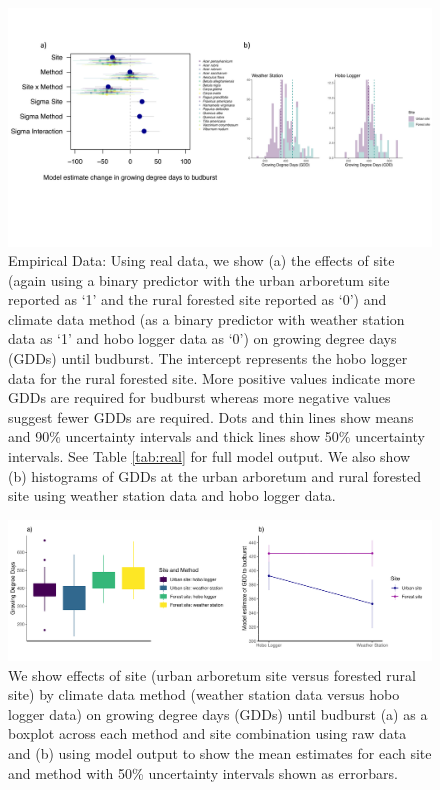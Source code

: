 \documentclass{article}\usepackage[]{graphicx}\usepackage[]{color}
\begin{document}
\begin{figure}[H]
    \centering
    \includegraphics[width=16cm, trim=0cm 5cm 0cm 0cm,]{..//analyses/figures/muandgdd.pdf}
\caption{ Empirical Data: Using real data, we show (a) the effects of site (again using a binary predictor with the urban arboretum site reported as `1' and the rural forested site reported as `0') and climate data method (as a binary predictor with weather station data as `1' and hobo logger data as `0') on growing degree days (GDDs) until budburst. The intercept represents the hobo logger data for the rural forested site. More positive values indicate more GDDs are required for budburst whereas more negative values suggest fewer GDDs are required. Dots and thin lines show means and 90\% uncertainty intervals and thick lines show 50\% uncertainty intervals. See Table \ref{tab:real} for full model output. We also show (b) histograms of GDDs at the urban arboretum and rural forested site using weather station data and hobo logger data.}
\label{fig:real}
\end{figure}

\begin{figure}[H]
      \centering
      \includegraphics[width=16cm]{..//analyses/figures/gdd_interaction.pdf}
\caption{ We show effects of site (urban arboretum site versus forested rural site) by climate data method (weather station data versus hobo logger data) on growing degree days (GDDs) until budburst (a) as a boxplot across each method and site combination using raw data and (b) using model output to show the mean estimates for each site and method with 50\% uncertainty intervals shown as errorbars.}
\label{fig:interaction}
\end{figure}
\end{document}
